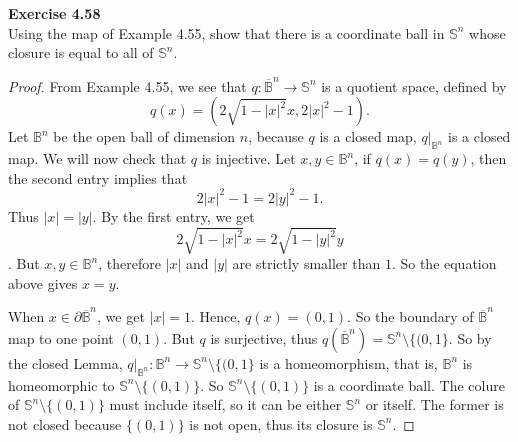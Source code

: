 \documentclass[12pt, a4paper]{article}
\theoremstyle{plain}
\newcommand{\set}[1]{\mathbb{#1}}
\newcommand{\mB}{\mathbb{B}}
\newcommand{\mS}{\mathbb{S}}
\newenvironment{exercise}[2][Exercise]
    { \begin{mdframed}[backgroundcolor=gray!20] \textbf{#1 #2} \\}
    {  \end{mdframed}}
\begin{document}
\begin{exercise}{4.58}
Using the map of Example 4.55, show that there is a coordinate ball in $\set{S}^n$ whose closure is equal to all of $\set{S}^n$.
\end{exercise}
    \begin{proof}
        From Example 4.55, we see that $q:\overline{\mB}^n\to \mS^n$ is a quotient space, defined by $$q(x) = (2\sqrt{1-|x|^2}x, 2|x|^2-1).$$
        Let $\mB^n$ be the open ball of dimension $n$, because $q$ is a closed map, $q|_{\mB^n}$ is a closed map. We will now check that $q$ is injective. Let $x,y\in \mB^n$, if $q(x)=q(y)$, then the second entry implies that $$2|x|^2-1=2|y|^2-1.$$ Thus $|x|=|y|$. By the first entry, we get $$2\sqrt{1-|x|^2}x = 2\sqrt{1-|y|^2}y$$. But $x,y\in \mB^n$, therefore $|x|$ and $|y|$ are strictly smaller than $1$. So the equation above gives $x=y$.

        When $x\in \partial \overline{\mB}^n$, we get $|x|=1$. Hence, $q(x)=(0,1)$. So the boundary of $\overline{\mB}^n$ map to one point $(0,1)$. But $q$ is surjective, thus $q(\overline{\mB}^n)=\mS^n\setminus\{(0,1\}$. So by the closed Lemma, $q|_{\mB^n}\colon \mB^n\to \mS^n\setminus\{(0,1\}$ is a homeomorphism, that is, $\mB^n$ is homeomorphic to $\mS^n\setminus \{(0,1)\}$. So $\mS^n\setminus \{(0,1)\}$ is a coordinate ball. The colure of $\mS^n\setminus \{(0,1)\}$ must include itself, so it can be either $\mS^n$ or itself. The former is not closed because $\{(0,1)\}$ is not open, thus its closure is $\mS^n$.
    \end{proof}

\pagebreak
\end{document}
